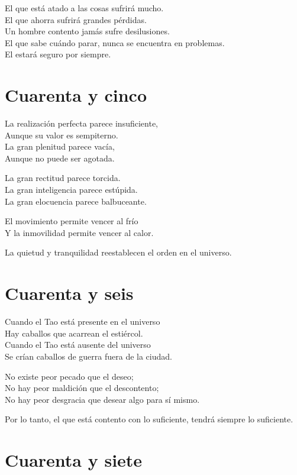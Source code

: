 \documentclass[hidelinks]{memoir}
\begin{document}
	El que está atado a las cosas sufrirá mucho.\\
	El que ahorra sufrirá grandes pérdidas.\\
	Un hombre contento jamás sufre desilusiones.\\
	El que sabe cuándo parar, nunca se encuentra en problemas.\\
	El estará seguro por siempre.
	
	\chapter*{Cuarenta y cinco}
	
	La realización perfecta parece insuficiente,\\
	Aunque su valor es sempiterno.\\
	La gran plenitud parece vacía,\\
	Aunque no puede ser agotada.
	
	La gran rectitud parece torcida.\\
	La gran inteligencia parece estúpida.\\
	La gran elocuencia parece balbuceante.
	
	El movimiento permite vencer al frío\\
	Y la inmovilidad permite vencer al calor.
	
	La quietud y tranquilidad reestablecen el orden en el universo.
	
	\chapter*{Cuarenta y seis}
	
	Cuando el Tao está presente en el universo\\
	Hay caballos que acarrean el estiércol.\\
	Cuando el Tao está ausente del universo\\
	Se crían caballos de guerra fuera de la ciudad.
	
	No existe peor pecado que el deseo;\\
	No hay peor maldición que el descontento;\\
	No hay peor desgracia que desear algo para sí mismo.
	
	Por lo tanto, el que está contento con lo suficiente, tendrá siempre lo
	suficiente.
	
	\chapter*{Cuarenta y siete}
	
\end{document}
